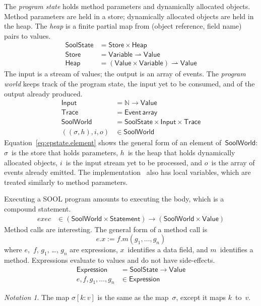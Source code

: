 \documentclass[preprint]{sigplanconf} %
\newcommand{\N}{\ensuremath{\mathbb{N}}}
\newcommand{\pmap}{\rightharpoonup}
\newcommand{\set}[1]{\ensuremath{\mathsf{#1}}}
\theoremstyle{definition}
\theoremstyle{remark}
\newtheorem{notation}{Notation}
\begin{document}
The \emph{program state} holds method parameters and dynamically allocated objects.
Method parameters are held in a store;
dynamically allocated objects are held in the heap.
The \emph{heap} is a finite partial map from (object reference, field name) pairs to values.
\begin{align}
\set{SoolState}&=\set{Store}\times\set{Heap}\\
\set{Store}&=\set{Variable}\pmap\set{Value} \\
\set{Heap}&=(\set{Value}\times\set{Variable})\pmap\set{Value}
\end{align}
The input is a stream of values;
the output is an array of events.
The \emph{program world} keeps track of the program state, the input yet to be consumed, and of the output already produced.
\begin{align}
\set{Input}&=\N\to\set{Value} \label{eq:input}\\
\set{Trace}&=\set{Event}\,\mathsf{array} \\
\set{SoolWorld}&=\set{SoolState}\times\set{Input}\times\set{Trace} \\
((\sigma, h), i, o)&\in\set{SoolWorld} \label{eq:epstate.element}
\end{align}
Equation~\eqref{eq:epstate.element} shows the general form of an element of~\set{SoolWorld}: $\sigma$~is the store that holds parameters, $h$~is the heap that holds dynamically allocated objects, $i$~is the input stream yet to be processed, and $o$~is the array of events already emitted.
The implementation~\cite{web:topl.prototype} also has local variables, which are treated similarly to method parameters.

Executing a SOOL program amounts to executing the \Verb@main@ body, which is a compound statement.
\begin{align}
\mathit{exec}&\in(\set{SoolWorld}\times\set{Statement})\to(\set{SoolWorld}\times\set{Value})
\end{align}
Method calls are interesting.
The general form of a method call is \[ e.x := f.m(g_1,\ldots,g_n)\] where $e$,~$f$, $g_1$, \dots, $g_n$ are expressions, $x$~identifies a data field, and $m$~identifies a method.
Expressions evaluate to values and do not have side-effects.
\begin{align}
\set{Expression}&=\set{SoolState}\to\set{Value} \\
e,f,g_1,\ldots,g_n&\in\set{Expression}
\end{align}

\begin{notation}
The map $\sigma[k:v]$ is the same as the map~$\sigma$, except it maps $k$~to~$v$.
\end{notation}
\end{document}
